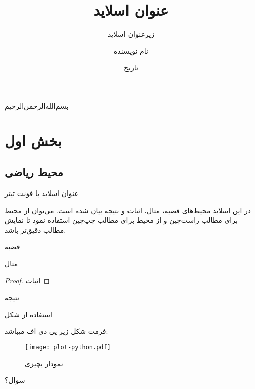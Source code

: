 \documentclass[xcolor=svgnames,10pt]{beamer}
\title{\titr عنوان اسلاید}
\subtitle{زیرعنوان اسلاید}
\author{نام نویسنده}
\institute{نام موسسه}
\date{تاریخ}
\begin{document}
\begin{frame}
\centering
\vspace{1cm}
{\nas بسم‌الله‌الرحمن‌الرحیم}
\end{frame}

\begin{frame}
\titlepage
\end{frame}

\section{بخش اول}
\subsection{محیط ریاضی}

\begin{frame}[t]{{\titr عنوان اسلاید با فونت تیتر}}
\begin{flushright}
در این اسلاید محیط‌های قضیه، مثال، اثبات و نتیجه بیان شده است.
می‌توان از محیط  برای مطالب راست‌چین و از محیط  برای مطالب چپ‌چین استفاده نمود تا نمایش مطالب دقیق‌تر باشد.
\end{flushright}

\pause
\begin{theorem}
قضیه
\end{theorem}

\pause
\begin{example}
مثال
\end{example}

\pause
\begin{proof}
اثبات
\end{proof}

\pause
\begin{corollary}
نتیجه
\end{corollary}
\end{frame}


\begin{frame}[t]{{\titr استفاده از شکل}}
	\begin{flushright}
فرمت شکل زیر پی دی اف میباشد:
	\end{flushright}
	\begin{figure}
		\centering
		\texttt{[image: plot-python.pdf]}
		\caption{نمودار یچیزی}
		\label{fig:graph-python}
	\end{figure}
\end{frame}

\begin{frame}
\centering
\vspace{1cm}
{\nas سوال؟}
\end{frame}
\end{document}
